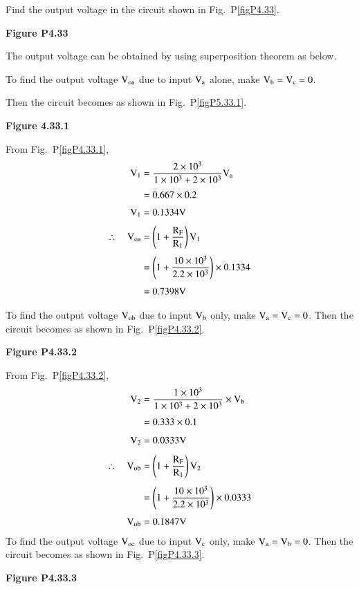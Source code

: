 \begin{problem}\label{prob4.33}
Find the output voltage in the circuit shown in Fig.~P\ref{figP4.33}.
\begin{center}
{\bf Figure P4.33}
\end{center}
\end{problem}

\begin{solution}
The output voltage can be obtained by using superposition theorem as below. 

\smallskip
To find the output voltage $\textrm{V}_{\textrm{o}\textrm{a}}$ due to input $\textrm{V}_{\textrm{a}}$ alone, make $\textrm{V}_{\textrm{b}}=\textrm{V}_{\textrm{c}}=0$.

\smallskip
Then the circuit becomes as shown in Fig.~P\ref{figP5.33.1}.
\begin{center}
{\bf Figure 4.33.1}
\end{center}

From Fig.~P\ref{figP4.33.1},
\begin{align*}
\textrm{V}_{1} &= \frac{2\times 10^{3}}{1\times 10^{3}+2\times 10^{3}}\textrm{V}_{\textrm{a}}\\[3pt]
&= 0.667\times 0.2\\[3pt]
\textrm{V}_{1} &= 0.1334\textrm{V}\\[3pt]
\therefore\quad \textrm{V}_{\textrm{o}\textrm{a}} &= \left(1+\frac{\textrm{R}_{\textrm{F}}}{\textrm{R}_{1}}\right)\textrm{V}_{1}\\[3pt]
&= \left(1+\frac{10\times 10^{3}}{2.2\times 10^{3}}\right)\times 0.1334\\[3pt]
&= 0.7398\textrm{V}
\end{align*}

To find the output voltage $\textrm{V}_{\textrm{o}\textrm{b}}$ due to input $\textrm{V}_{\textrm{b}}$ only, make $\textrm{V}_{\textrm{a}}=\textrm{V}_{\textrm{c}}=0$. Then the circuit becomes as shown in Fig.~P\ref{figP4.33.2}.
\begin{center}
{\bf Figure P4.33.2}
\end{center}

From Fig.~P\ref{figP4.33.2},
\begin{align*}
\textrm{V}_{2} &= \frac{1\times 10^{3}}{1\times 10^{3}+2\times 10^{3}}\times \textrm{V}_{\textrm{b}}\\[4pt]
&= 0.333\times 0.1\\[4pt]
\textrm{V}_{2} &= 0.0333\textrm{V}\\[4pt]
\therefore\quad \textrm{V}_{\textrm{o}\textrm{b}} &= \left(1+\frac{\textrm{R}_{\textrm{F}}}{\textrm{R}_{1}}\right)\textrm{V}_{2}\\[4pt]
&= \left(1+\frac{10\times 10^{3}}{2.2\times 10^{3}}\right)\times 0.0333\\[3pt]
\textrm{V}_{\textrm{o}\textrm{b}} &= 0.1847\textrm{V}
\end{align*}
To find the output voltage $\textrm{V}_{\textrm{o}\textrm{c}}$ due to input $\textrm{V}_{\textrm{c}}$ only, make $\textrm{V}_{\textrm{a}}=\textrm{V}_{\textrm{b}}=0$. Then the circuit becomes as shown in Fig.~P\ref{figP4.33.3}.
\begin{center}
{\bf Figure P4.33.3}
\end{center}


\end{solution}
